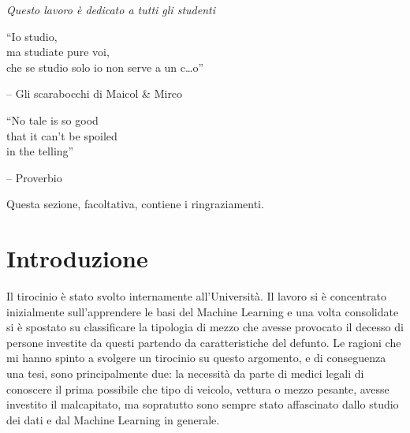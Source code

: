 \documentclass[12pt,italian]{report}
\begin{document}
\frontespizio
\beforepreface

% 
%

{\raggedleft \large \sl Questo lavoro \`{e} dedicato a tutti gli studenti\\
	
	\vspace{2cm}
	
	``Io studio,\\ma studiate pure voi,\\che se studio solo io non serve a un c\dots o''
	
	\bigskip
	
	\--- Gli scarabocchi di Maicol \& Mirco\\
  
	\vspace{2cm}
	
	``No tale is so good \\ that it can't be spoiled \\ in the telling''
	
	\bigskip
	
	\--- Proverbio\\}
         
% 
%


%
%

Questa sezione, facoltativa, contiene i ringraziamenti.

%
%

\afterpreface

% 
% 

\chapter*{Introduzione}
\label{cap:introduzione}
Il tirocinio è stato svolto internamente all'Università. Il lavoro si è concentrato inizialmente sull'apprendere le basi del Machine Learning e una volta consolidate si è spostato su classificare la tipologia di mezzo che avesse provocato il decesso di persone investite da questi partendo da caratteristiche del defunto. Le ragioni che mi hanno spinto a svolgere un tirocinio su questo argomento, e di conseguenza una tesi, sono principalmente due: la necessità da parte di medici legali di conoscere il prima possibile che tipo di veicolo, vettura o mezzo pesante, avesse investito il malcapitato, ma sopratutto sono sempre stato affascinato dallo studio dei dati e dal Machine Learning in generale.
\end{document}
